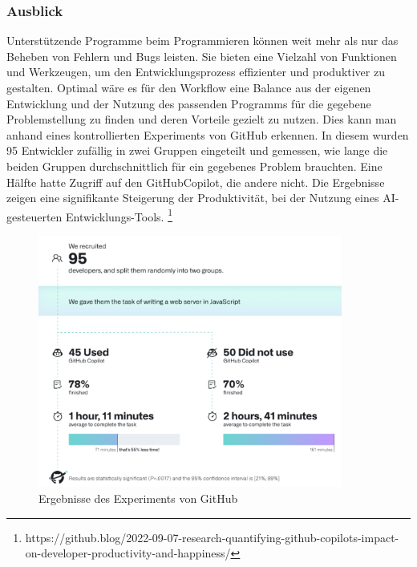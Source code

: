 \documentclass[11pt,a4paper]{article}
\begin{document}
\subsubsection{Ausblick}
Unterstützende Programme beim Programmieren können weit mehr als nur das Beheben von Fehlern und Bugs leisten. Sie bieten eine Vielzahl von Funktionen und Werkzeugen, um den Entwicklungsprozess effizienter und produktiver zu gestalten.
Optimal wäre es für den Workflow eine Balance aus der eigenen Entwicklung und der Nutzung des passenden Programms für die gegebene Problemstellung zu finden und deren Vorteile gezielt zu nutzen. Dies kann man anhand eines kontrollierten Experiments von GitHub erkennen. In diesem wurden 95 Entwickler zufällig in zwei Gruppen eingeteilt und gemessen, wie lange die beiden Gruppen durchschnittlich für ein gegebenes Problem brauchten.
Eine Hälfte hatte Zugriff auf den GitHubCopilot, die andere nicht. Die Ergebnisse zeigen eine signifikante Steigerung der Produktivität, bei der Nutzung eines AI-gesteuerten Entwicklungs-Tools. \footnote{https://github.blog/2022-09-07-research-quantifying-github-copilots-impact-on-developer-productivity-and-happiness/}
\begin{figure}[h!]
\includegraphics[width=100mm,scale=0.3, center]{copilot.png}
\caption{Ergebnisse des Experiments von GitHub}
\label{fig:figure5}
\end{figure}








\end{document}
